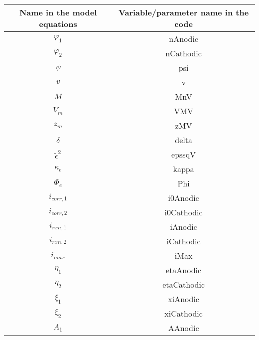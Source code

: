 \documentclass[11pt]{article}
\begin{document}
\begin{table}[h]
\label{code_vars}
\begin{center}
\begin{tabular}{|c|c|}
 \hline
 Name in the model equations& Variable/parameter name in the code\\
 \hline
 $\varphi_1$                &nAnodic                             \\
 $\varphi_2$                &nCathodic                            \\
 $\psi$                     &psi                                    \\
 $v$                        &v                                       \\
 $M$                        &MnV                                    \\
 $V_m$                      &VMV                                   \\
 $z_m$                      &zMV                                  \\
 $\delta$                   &delta                                 \\
 $\widetilde{{\epsilon}}^2$ &epssqV                               \\
 $\kappa_e$                 &kappa                               \\
 $\Phi_e$                   &Phi                                  \\
 $i_{corr,1}$               &i0Anodic                            \\
 $i_{corr,2}$               &i0Cathodic                         \\
 $i_{rxn,1}$                &iAnodic                            \\
 $i_{rxn,2}$                &iCathodic                          \\
 $i_{max}$                  &iMax                              \\
 $\eta_1$                   &etaAnodic                          \\
 $\eta_2$                   &etaCathodic                       \\
 $\xi_1$                    &xiAnodic                            \\
 $\xi_2$                    &xiCathodic                         \\
 $A_1$                      &AAnodic                            \\

\end{tabular}
\end{center}
\end{table}
\end{document}
